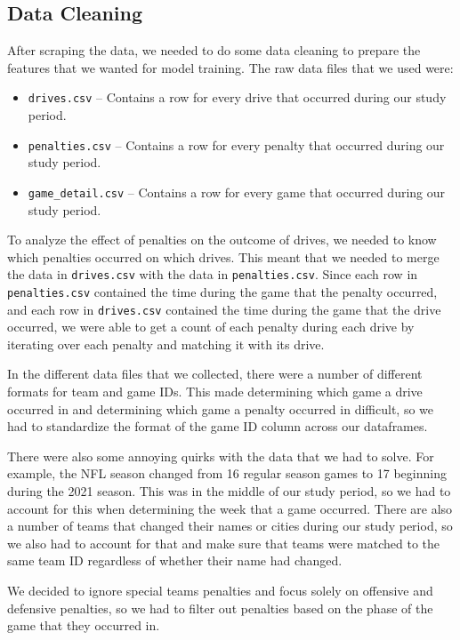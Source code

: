 \documentclass[sigconf, nonacm]{acmart}
\begin{document}
\subsection{Data Cleaning}

After scraping the data, we needed to do some data cleaning to prepare the
features that we wanted for model training. The raw data files that we used
were:

\begin{itemize}
  \item \verb|drives.csv| -- Contains a row for every drive that occurred during
    our study period.
  \item \verb|penalties.csv| -- Contains a row for every penalty that occurred
    during our study period.
  \item \verb|game_detail.csv| -- Contains a row for every game that occurred
    during our study period.
\end{itemize}

To analyze the effect of penalties on the outcome of drives, we needed to know
which penalties occurred on which drives. This meant that we needed to merge
the data in \verb|drives.csv| with the data in \verb|penalties.csv|. Since each
row in \verb|penalties.csv| contained the time during the game that the penalty
occurred, and each row in \verb|drives.csv| contained the time during the game
that the drive occurred, we were able to get a count of each penalty during each
drive by iterating over each penalty and matching it with its drive.

In the different data files that we collected, there were a number of different
formats for team and game IDs. This made determining which game a drive occurred
in and determining which game a penalty occurred in difficult, so we had to
standardize the format of the game ID column across our dataframes.

There were also some annoying quirks with the data that we had to solve. For
example, the NFL season changed from 16 regular season games to 17 beginning
during the 2021 season. This was in the middle of our study period, so we had
to account for this when determining the week that a game occurred. There are
also a number of teams that changed their names or cities during our study
period, so we also had to account for that and make sure that teams were matched
to the same team ID regardless of whether their name had changed.

We decided to ignore special teams penalties and focus solely on offensive and
defensive penalties, so we had to filter out penalties based on the phase of the
game that they occurred in.
\end{document}

